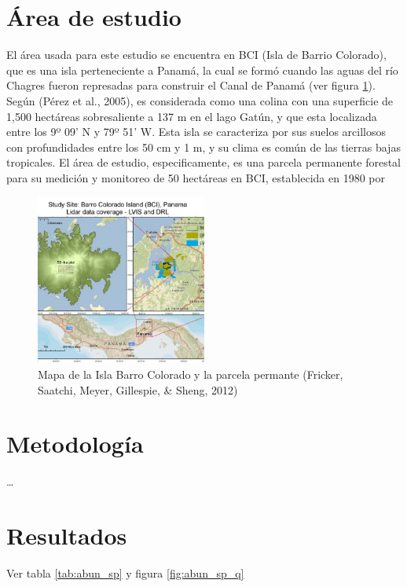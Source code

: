 \documentclass[11pt,]{article}
\begin{document}
\section{Área de estudio}\label{uxe1rea-de-estudio}

El área usada para este estudio se encuentra en BCI (Isla de Barrio
Colorado), que es una isla perteneciente a Panamá, la cual se formó
cuando las aguas del río Chagres fueron represadas para construir el
Canal de Panamá (ver figura \ref{fig:bci}). Según (Pérez et al., 2005),
es considerada como una colina con una superficie de 1,500 hectáreas
sobresaliente a 137 m en el lago Gatún, y que esta localizada entre los
9º 09' N y 79º 51' W. Esta isla se caracteriza por sus suelos arcillosos
con profundidades entre los 50 cm y 1 m, y su clima es común de las
tierras bajas tropicales. El área de estudio, especificamente, es una
parcela permanente forestal para su medición y monitoreo de 50 hectáreas
en BCI, establecida en 1980 por

\begin{figure}
\centering
\includegraphics[width=0.50000\textwidth]{mapa bci.jpg}
\caption{Mapa de la Isla Barro Colorado y la parcela
permante\label{fig:bci} (Fricker, Saatchi, Meyer, Gillespie, \& Sheng,
2012)}
\end{figure}

\section{Metodología}\label{metodologuxeda}

\ldots

\section{Resultados}\label{resultados}

Ver tabla \ref{tab:abun_sp} y figura \ref{fig:abun_sp_q}
\end{document}
